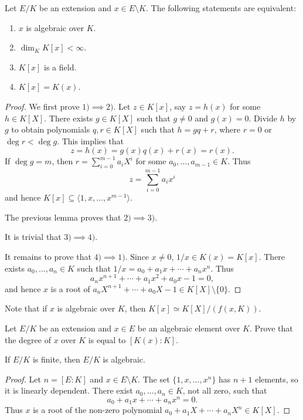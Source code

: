 \begin{theorem}
\label{thm:simple extesnions}
	Let $E/K$ be an extension and $x\in E\setminus K$.
	The following statements are equivalent:
	\begin{enumerate}
		\item $x$ is algebraic over $K$.
		\item $\dim_KK[x]<\infty$.
		\item $K[x]$ is a field.
		\item $K[x]=K(x)$. 
	\end{enumerate}
\end{theorem}

\begin{proof}
	We first prove $1)\implies 2)$. Let $z\in K[x]$, say $z=h(x)$ for some $h\in K[X]$. There exists
	$g\in K[X]$ such that $g\ne 0$ and $g(x)=0$. Divide $h$ by $g$ to obtain 
	polynomials $q,r\in K[X]$ such that $h=gq+r$, where $r=0$ or $\deg r<\deg g$. This implies that
	\[
		z=h(x)=g(x)q(x)+r(x)=r(x).
	\]
	If $\deg g=m$, then $r=\sum_{i=0}^{m-1}a_iX^i$ for some $a_0,\dots,a_{m-1}\in K$. Thus
	\[
 z=\sum_{i=0}^{m-1}a_ix^i 
 \]
 and hence $K[x]\subseteq\langle 1,x,\dots,x^{m-1}\rangle$. 

	The previous lemma proves that $2)\implies 3)$. 

	It is trivial that $3)\implies 4)$. 

	It remains to prove that $4)\implies 1)$. 
	Since $x\ne 0$, $1/x\in K(x)=K[x]$. There exists $a_0,\dots,a_n\in K$ such that
	$1/x=a_0+a_1x+\cdots+a_nx^n$. Thus
	\[
		a_nx^{n+1}+\cdots+a_1x^2+a_0x-1=0, 
	\]
	and hence $x$ is a root of $a_nX^{n+1}+\cdots+a_0X-1\in K[X]\setminus\{0\}$. 
\end{proof}

Note that if $x$ is algebraic over $K$, then
$K[x]\simeq K[X]/(f(x,K))$. 

\begin{exercise}
\label{xca:degree_of_x}
    Let $E/K$ be an extension and $x\in E$ be an algebraic element over $K$.
    Prove that the degree of $x$ over $K$ is equal to $[K(x):K]$. 
\end{exercise}

\begin{corollary}
\label{cor:finite=>algebraic}
	If $E/K$ is finite, then $E/K$ is algebraic. 
\end{corollary}

\begin{proof}
	Let $n=[E:K]$ and $x\in E\setminus K$. The set $\{1,x,\dots,x^n\}$ has $n+1$ elements, so it is linearly dependent. 
	There exist $a_0,\dots,a_n\in K$, not all zero, such that
	\[
        a_0+a_1x+\cdots+a_nx^n=0.
        \]
        Thus $x$ is a root of the non-zero
	polynomial $a_0+a_1X+\cdots+a_nX^n\in K[X]$. 
\end{proof}

